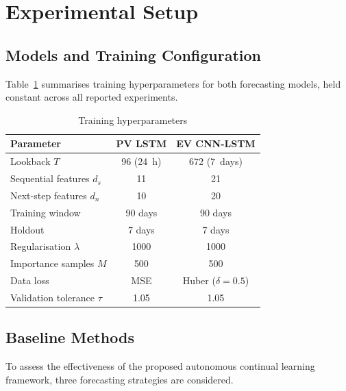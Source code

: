 \documentclass[journal]{IEEEtran}
\newcommand{\ewclambda}{\lambda}
\begin{document}


\section{Experimental Setup}
\label{sec:experimental}


\subsection{Models and Training Configuration}

Table~\ref{tab:hyperparams} summarises training hyperparameters for
both forecasting models, held constant across all reported experiments.

\begin{table}[t]
\centering
\caption{Training hyperparameters}
\label{tab:hyperparams}
\begin{tabular}{@{}lcc@{}}
\toprule
\textbf{Parameter} & \textbf{PV LSTM} & \textbf{EV CNN-LSTM} \\
\midrule
Lookback $T$ & 96 (24~h) & 672 (7~days) \\
Sequential features $d_s$ & 11 & 21 \\
Next-step features $d_n$ & 10 & 20 \\
Training window & 90 days & 90 days \\
Holdout & 7 days & 7 days \\
Regularisation $\ewclambda$ & 1000 & 1000 \\
Importance samples $M$ & 500 & 500 \\
Data loss & MSE & Huber ($\delta{=}0.5$) \\
Validation tolerance $\tau$ & 1.05 & 1.05 \\
\bottomrule
\end{tabular}
\end{table}
\subsection{Baseline Methods}
\label{sec:baselines}

To assess the effectiveness of the proposed autonomous continual
learning framework, three forecasting strategies are considered.
\end{document}

